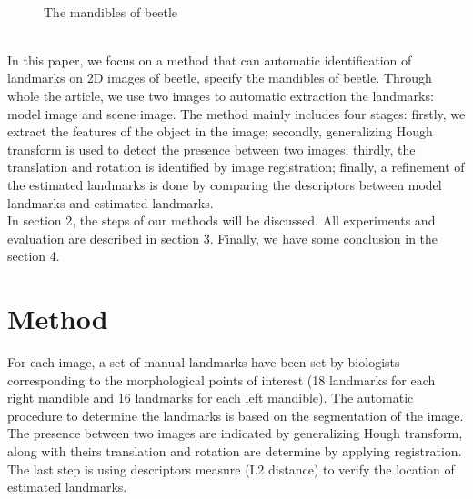 \documentclass[twoside,twocolumn,10pt]{article}
\begin{document}
\begin{figure}[h]
\centering
{}~~
\caption{The mandibles of beetle}
\label{figparts}
\end{figure}~\\[0.2cm]
In this paper, we focus on a method that can automatic identification
of landmarks on 2D images of beetle, specify the mandibles of
beetle. Through whole the article, we use two images to automatic
extraction the landmarks: model image and scene image. The method
mainly includes four stages: firstly, we extract the features of the
object in the image; secondly, generalizing Hough transform is used to
detect the presence between two images; thirdly, the translation and
rotation is identified by image registration; finally, a refinement of
the estimated landmarks is done by comparing the descriptors  between
model landmarks and estimated landmarks.\\[0.2cm]

In section 2, the steps of our methods will be discussed. All
experiments and evaluation are described in section 3. Finally, we
have some conclusion in the section 4.


\section{Method}
For each image, a set of manual landmarks have been set by biologists
corresponding to the morphological points of interest (18 landmarks
for each right mandible and 16 landmarks for each left mandible). The
automatic procedure to determine the landmarks is based on the
segmentation of the image. The presence between two images are
indicated by generalizing Hough transform, along with theirs
translation and rotation are determine by applying registration. The
last step is using descriptors measure (L2 distance) to verify the
location of estimated landmarks.
\end{document}
